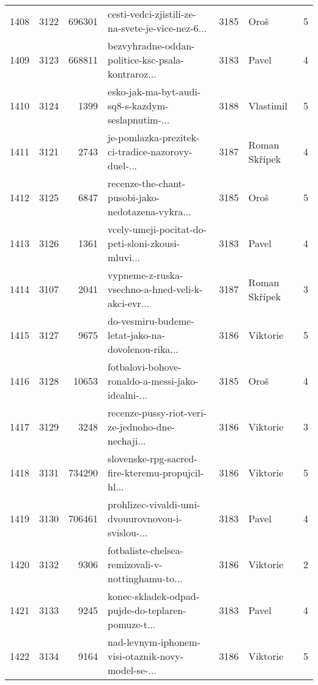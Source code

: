 \begin{tabular}{lrrlrlr}
1408 &       3122 &   696301 &  cesti-vedci-zjistili-ze-na-svete-je-vice-nez-6... &     3185 &                         Oroš &               5 \\
1409 &       3123 &   668811 &  bezvyhradne-oddan-politice-ksc-psala-kontraroz... &     3183 &                        Pavel &               4 \\
1410 &       3124 &     1399 &  esko-jak-ma-byt-audi-sq8-s-kazdym-seslapnutim-... &     3188 &                    Vlastimil &               5 \\
1411 &       3121 &     2743 &  je-pomlazka-prezitek-ci-tradice-nazorovy-duel-... &     3187 &                Roman Skřípek &               4 \\
1412 &       3125 &     6847 &  recenze-the-chant-pusobi-jako-nedotazena-vykra... &     3185 &                         Oroš &               5 \\
1413 &       3126 &     1361 &  vcely-umeji-pocitat-do-peti-sloni-zkousi-mluvi... &     3183 &                        Pavel &               4 \\
1414 &       3107 &     2041 &  vypneme-z-ruska-vsechno-a-hned-veli-k-akci-evr... &     3187 &                Roman Skřípek &               3 \\
1415 &       3127 &     9675 &  do-vesmiru-budeme-letat-jako-na-dovolenou-rika... &     3186 &                     Viktorie &               5 \\
1416 &       3128 &    10653 &  fotbalovi-bohove-ronaldo-a-messi-jako-idealni-... &     3185 &                         Oroš &               4 \\
1417 &       3129 &     3248 &  recenze-pussy-riot-veri-ze-jednoho-dne-nechaji... &     3186 &                     Viktorie &               3 \\
1418 &       3131 &   734290 &  slovenske-rpg-sacred-fire-kteremu-propujcil-hl... &     3186 &                     Viktorie &               5 \\
1419 &       3130 &   706461 &  prohlizec-vivaldi-umi-dvouurovnovou-i-svislou-... &     3183 &                        Pavel &               4 \\
1420 &       3132 &     9306 &  fotbaliste-chelsea-remizovali-v-nottinghamu-to... &     3186 &                     Viktorie &               2 \\
1421 &       3133 &     9245 &  konec-skladek-odpad-pujde-do-teplaren-pomuze-t... &     3183 &                        Pavel &               4 \\
1422 &       3134 &     9164 &  nad-levnym-iphonem-visi-otaznik-novy-model-se-... &     3186 &                     Viktorie &               5 \\

\end{tabular}
